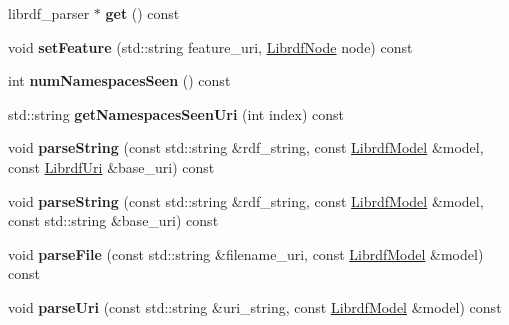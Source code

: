 \begin{DoxyCompactItemize}
\mbox{\label{classredland_1_1LibrdfParser_aadb297b986879ca618d3092fe737d41c}} 
librdf\+\_\+parser $\ast$ {\bfseries get} () const
\item 
\mbox{\label{classredland_1_1LibrdfParser_aa00b1ab4b50a7d5469dd012752ed4dc8}} 
void {\bfseries set\+Feature} (std\+::string feature\+\_\+uri, \hyperlink{classredland_1_1LibrdfNode}{Librdf\+Node} node) const
\item 
\mbox{\label{classredland_1_1LibrdfParser_a1e2098e2c99ba886ab1521048258600c}} 
int {\bfseries num\+Namespaces\+Seen} () const
\item 
\mbox{\label{classredland_1_1LibrdfParser_aed92021f88bccfa26bf78c29797b4208}} 
std\+::string {\bfseries get\+Namespaces\+Seen\+Uri} (int index) const
\item 
\mbox{\label{classredland_1_1LibrdfParser_a86739506ba32a9a6da8b69711f1026db}} 
void {\bfseries parse\+String} (const std\+::string \&rdf\+\_\+string, const \hyperlink{classredland_1_1LibrdfModel}{Librdf\+Model} \&model, const \hyperlink{classredland_1_1LibrdfUri}{Librdf\+Uri} \&base\+\_\+uri) const
\item 
\mbox{\label{classredland_1_1LibrdfParser_a2a7ac5ac97b4bc5876db02f0b9c7b987}} 
void {\bfseries parse\+String} (const std\+::string \&rdf\+\_\+string, const \hyperlink{classredland_1_1LibrdfModel}{Librdf\+Model} \&model, const std\+::string \&base\+\_\+uri) const
\item 
\mbox{\label{classredland_1_1LibrdfParser_a15ffb21bf48e486708eab820719827a6}} 
void {\bfseries parse\+File} (const std\+::string \&filename\+\_\+uri, const \hyperlink{classredland_1_1LibrdfModel}{Librdf\+Model} \&model) const
\item 
\mbox{\label{classredland_1_1LibrdfParser_a733bf5d33a2d71bd6d7c201e1c952b04}} 
void {\bfseries parse\+Uri} (const std\+::string \&uri\+\_\+string, const \hyperlink{classredland_1_1LibrdfModel}{Librdf\+Model} \&model) const
\item 

\end{DoxyCompactItemize}

